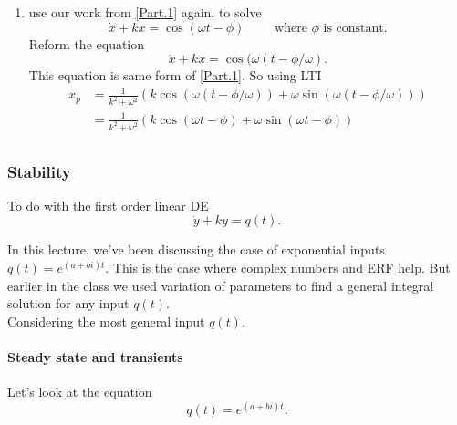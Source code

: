 \begin{enumerate}[label=\textbf{Part.\arabic*}]
\item use our work from \ref{Part.1} again, to solve
  \begin{equation*}
    \dot{x} + kx = \cos (\omega t - \phi) \qquad \text{ where } \phi \text{ is constant}.
  \end{equation*}
  Reform the equation
  \begin{equation*}
      \dot{x} + kx = \cos (\omega (t - \phi / \omega).   
  \end{equation*}
  This equation is same form of \ref{Part.1}. So using LTI
  \begin{align*}
    x_ p & = \frac{1}{k^2 + \omega ^2} \left( k \cos \left( \omega ( t - \phi / \omega) \right)
    + \omega \sin \left( \omega (t - \phi / \omega) \right) \right) \\
    &= \frac{1}{k^2 + \omega ^2} \left( k \cos (\omega t - \phi)  + \omega \sin (\omega t - \phi ) \right) \\
  \end{align*}
\end{enumerate}

\clearpage
\subsubsection{Stability} 
To do with the first order linear DE
\begin{equation*}
  \dot{y} + ky = q(t).
\end{equation*}

In this lecture, we've been discussing the case of exponential inputs
$q(t) = e^{(a + bi)t}$.
This is the case where complex numbers and ERF help.
But earlier in the class we used {\color{blue} variation of parameters} to find
a general integral solution for any input $q(t)$.\\
Considering the most general input $q(t)$.

\paragraph{Steady state and transients} \label{stablilty}

Let's look at the equation
\begin{equation*}
  q(t) = e^{(a + bi)t}.
\end{equation*}

